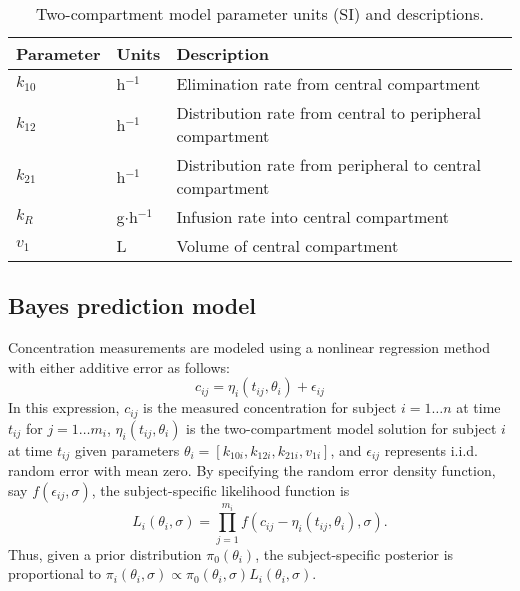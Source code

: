 \documentclass{article}
\begin{document}
\begin{table}
\begin{tabular}{lll} \hline
Parameter & Units & Description \\ \hline
$k_{10}$ & h$^{-1}$ & Elimination rate from central compartment\\
$k_{12}$ & h$^{-1}$ & Distribution rate from central to peripheral compartment\\
$k_{21}$ & h$^{-1}$ & Distribution rate from peripheral to central compartment\\
$k_R$  & g$\cdot$h$^{-1}$ & Infusion rate into central compartment\\
$v_1$  & L & Volume of central compartment\\
\hline
\end{tabular}
\caption{Two-compartment model parameter units (SI) and descriptions. \label{tab:pkpars}}
\end{table}

\subsection{Bayes prediction model}
Concentration measurements are modeled using a nonlinear regression method with either additive error as follows:
\begin{displaymath}
c_{ij} = \eta_i(t_{ij}, \theta_i) + \epsilon_{ij}
\end{displaymath}
\noindent In this expression, $c_{ij}$ is the measured concentration for subject $i = 1 \ldots n$ at time $t_{ij}$ for $j = 1 \ldots m_i$, $\eta_i(t_{ij}, \theta_i)$ is the two-compartment model solution for subject $i$ at time $t_{ij}$ given parameters $\theta_i = [k_{10i}, k_{12i}, k_{21i}, v_{1i}]$, and $\epsilon_{ij}$ represents i.i.d. random error with mean zero. By specifying the random error density function, say $f(\epsilon_{ij}, \sigma)$, the subject-specific likelihood function is 
\begin{displaymath}
L_i(\theta_i, \sigma) = \prod_{j=1}^{m_i} f(c_{ij} - \eta_i(t_{ij}, \theta_i), \sigma).
\end{displaymath}
\noindent Thus, given a prior distribution $\pi_0(\theta_i)$, the subject-specific posterior is proportional to $\pi_i(\theta_i, \sigma) \propto \pi_0(\theta_i,\sigma)L_i(\theta_i,\sigma)$.
\end{document}
